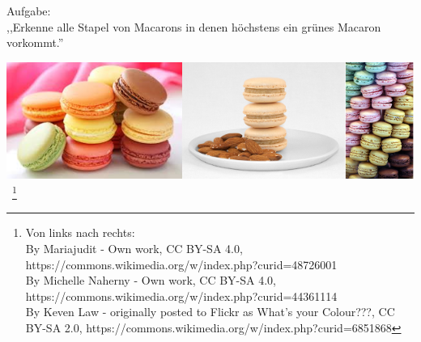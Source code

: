 \begin{Bsp}Aufgabe: 
  \\
  \label{Bsp:3.1}
  ,,Erkenne alle Stapel von Macarons in denen höchstens ein grünes Macaron vorkommt.''
\begin{center}
  \includegraphics[scale=0.4]{macaron-stacks.png}~\footnote{
  \tiny Von links nach rechts: \\
By Mariajudit - Own work, CC BY-SA 4.0, https://commons.wikimedia.org/w/index.php?curid=48726001
  \\
By Michelle Naherny - Own work, CC BY-SA 4.0, https://commons.wikimedia.org/w/index.php?curid=44361114
  \\
By Keven Law - originally posted to Flickr as What's your Colour???, CC BY-SA 2.0, https://commons.wikimedia.org/w/index.php?curid=6851868
}


\end{center}
\end{Bsp}
